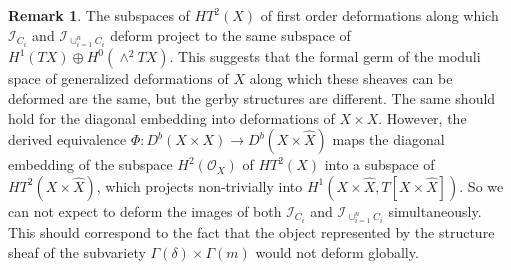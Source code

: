 \documentclass[12pt]{amsart}
\numberwithin{equation}{subsection}
\theoremstyle{plain}
\theoremstyle{definition}
\newtheorem{rem}[thm]{Remark}
\newcommand{\StructureSheaf}[1]{{\mathcal O}_{#1}}
\newcommand{\Ideal}[1]{{\mathcal I}_{#1}}
\begin{document}
{\begin{rem}
The subspaces of $HT^2(X)$ of first order deformations along which $\Ideal{C_i}$ and $\Ideal{\cup_{i=1}^nC_i}$
deform project to the same subspace of $H^1(TX)\oplus H^0(\wedge^2TX)$. This suggests that the formal germ of the moduli space of generalized deformations of $X$ along which these sheaves can be deformed are the same, but the gerby structures are different. The same should hold for the diagonal embedding into deformations of $X\times X$. However, the derived equivalence $\Phi:D^b(X\times X)\rightarrow D^b(X\times\hat{X})$  maps the diagonal embedding of the subspace $H^2(\StructureSheaf{X})$
of $HT^2(X)$ into a subspace of $HT^2(X\times\hat{X})$, which projects non-trivially into $H^1(X\times\hat{X},T[X\times\hat{X}])$.
So we can not expect to deform the images of both $\Ideal{C_i}$ and $\Ideal{\cup_{i=1}^nC_i}$ simultaneously. This should correspond to the fact that the object represented by the structure sheaf of the subvariety $\Gamma(\delta)\times \Gamma(m)$ would not deform globally.
\end{rem}

}
\end{document}
